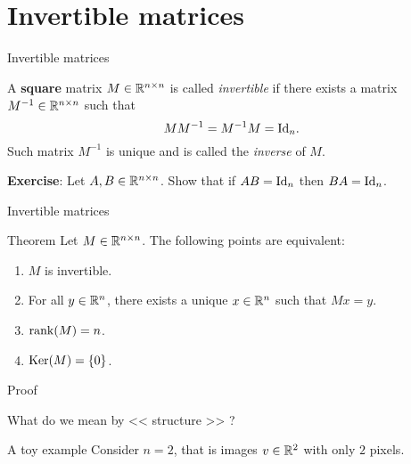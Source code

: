 \documentclass{beamer}
\begin{document}
\section{Invertible matrices}

\begin{frame}[t]{Invertible matrices}
	\grid

	\vspace{-0.3cm}

	\begin{definition}\label{prop:matrix_inverse}
		A \textbf{square} matrix $M \in \mathbb{R}^{n \times n}$ is called \emph{invertible} if there exists a matrix $M^{-1} \in \mathbb{R}^{n \times n}$ such that 
		$$
		M M^{-1} = M^{-1} M = {{\rm Id}}_n.
		$$
		Such matrix $M^{-1}$ is unique and is called the \emph{inverse} of $M$.
	\end{definition}
	\textbf{Exercise}: Let $A,B \in \mathbb{R}^{n \times n}$. Show that if $AB = {{\rm Id}}_n$ then $BA = {{\rm Id}}_n$.

\end{frame}

\begin{frame}[t]{Invertible matrices}
	\grid

	\vspace{-0.3cm}

	\begin{block}{Theorem}
		Let $M \in \mathbb{R}^{n \times n}$. The following points are equivalent:
		\begin{enumerate}
			\item \label{item:th_i} $M$ is invertible.
			\item For all $y \in \mathbb{R}^n$, there exists a unique $x \in \mathbb{R}^n$ such that $Mx=y$.
			\item \label{item:th_ii} ${{\rm rank}}(M) = n$.
			\item \label{item:th_iii} ${{\rm Ker}}(M) = \{0\}$.
		\end{enumerate}
	\end{block}

\end{frame}
\begin{frame}[t]{Proof}
	\grid

	\pause
	\pause
	\pause
\end{frame}


\begin{frame}{What do we mean by << structure >> ?}
\end{frame}

\begin{frame}[t]{A toy example}
	Consider $n = 2$, that is images $v\in\mathbb{R}^2$ with only $2$ pixels.
\end{frame}
\end{document}

